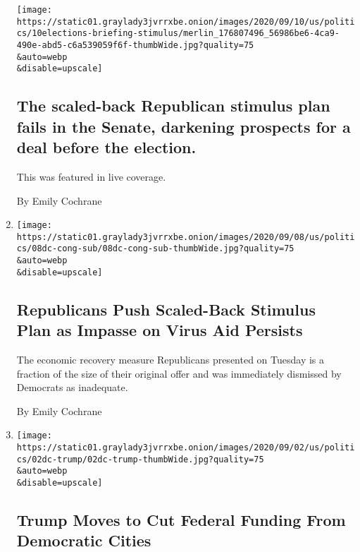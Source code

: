 \begin{enumerate}
  \texttt{[image: https://static01.graylady3jvrrxbe.onion/images/2020/09/10/us/politics/10elections-briefing-stimulus/merlin\_176807496\_56986be6-4ca9-490e-abd5-c6a539059f6f-thumbWide.jpg?quality=75\\\&auto=webp\\\&disable=upscale]}

  \hypertarget{the-scaled-back-republican-stimulus-plan-fails-in-the-senate-darkening-prospects-for-a-deal-before-the-election}{%
  \subsection{The scaled-back Republican stimulus plan fails in the
  Senate, darkening prospects for a deal before the
  election.}\label{the-scaled-back-republican-stimulus-plan-fails-in-the-senate-darkening-prospects-for-a-deal-before-the-election}}

  This was featured in live coverage.

  By Emily Cochrane
\item
  \href{/2020/09/08/us/politics/congress-coronavirus-stimulus.html}{}

  \texttt{[image: https://static01.graylady3jvrrxbe.onion/images/2020/09/08/us/politics/08dc-cong-sub/08dc-cong-sub-thumbWide.jpg?quality=75\\\&auto=webp\\\&disable=upscale]}

  \hypertarget{republicans-push-scaled-back-stimulus-plan-as-impasse-on-virus-aid-persists}{%
  \subsection{Republicans Push Scaled-Back Stimulus Plan as Impasse on
  Virus Aid
  Persists}\label{republicans-push-scaled-back-stimulus-plan-as-impasse-on-virus-aid-persists}}

  The economic recovery measure Republicans presented on Tuesday is a
  fraction of the size of their original offer and was immediately
  dismissed by Democrats as inadequate.

  By Emily Cochrane
\item
  \href{/2020/09/02/us/politics/trump-funding-cities.html}{}

  \texttt{[image: https://static01.graylady3jvrrxbe.onion/images/2020/09/02/us/politics/02dc-trump/02dc-trump-thumbWide.jpg?quality=75\\\&auto=webp\\\&disable=upscale]}

  \hypertarget{trump-moves-to-cut-federal-funding-from-democratic-cities}{%
  \subsection{Trump Moves to Cut Federal Funding From Democratic
  Cities}\label{trump-moves-to-cut-federal-funding-from-democratic-cities}}


\end{enumerate}
